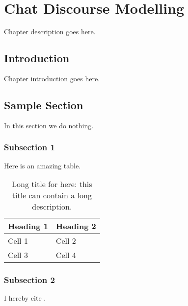 
\chapter{Chat Discourse Modelling} %
\label{ch:PD}

\begin{textsl}
{\small Chapter description goes here.}
\end{textsl}

\vspace*{1cm}




\section{Introduction}
Chapter introduction goes here.

\section{Sample Section}
In this section we do nothing.
\subsection{Subsection 1}
Here is an amazing table.
\begin{table}
 \centering
 \begin{tabular}{ | l l | }
 \hline
  \textbf{Heading 1} & \textbf{Heading 2} \\ \hline
   Cell 1 & Cell 2 \\
   Cell 3 & Cell 4 \\ \hline
 \end{tabular}
 \caption [Short title for list of tables]{Long title for here: this title can contain a long description.}
 \label{tbl:dt_chi2}
\end{table}
\subsection{Subsection 2}
I hereby cite \cite{ref1}.

